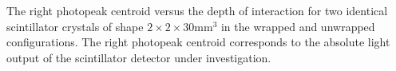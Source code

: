 \label{fig:lightoutput} The right photopeak centroid versus the depth of interaction for two identical scintillator crystals of shape $2\times2\times30$mm$^3$ in the wrapped and unwrapped configurations. The right photopeak centroid corresponds to the absolute light output of the scintillator detector under investigation.